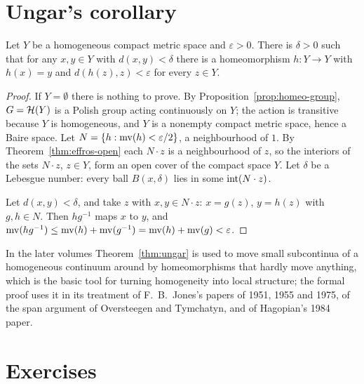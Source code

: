 \section{Ungar's corollary}

\begin{theorem}\label{thm:ungar}
Let $Y$ be a homogeneous compact metric space and $\varepsilon>0$. There is $\delta>0$ such that for any
$x,y\in Y$ with $d(x,y)<\delta$ there is a homeomorphism $h\colon Y\to Y$ with $h(x)=y$ and
$d(h(z),z)<\varepsilon$ for every $z\in Y$.
\end{theorem}

\begin{proof}
If $Y=\emptyset$ there is nothing to prove. By Proposition~\ref{prop:homeo-group}, $G=\mathcal{H}(Y)$ is a
Polish group acting continuously on $Y$; the action is transitive because $Y$ is homogeneous, and $Y$
is a nonempty compact metric space, hence a Baire space. Let $N=\left\{ h:\operatorname{mv}(h)<\varepsilon/2 \right\}$, a
neighbourhood of $1$. By Theorem~\ref{thm:effros-open} each $N\cdot z$ is a neighbourhood of $z$, so the
interiors of the sets $N\cdot z$, $z\in Y$, form an open cover of the compact space $Y$. Let $\delta$ be
a Lebesgue number: every ball $B(x,\delta)$ lies in some $\operatorname{int}(N\cdot z)$.

Let $d(x,y)<\delta$, and take $z$ with $x,y\in N\cdot z$: $x=g(z)$, $y=h(z)$ with $g,h\in N$. Then
$hg^{-1}$ maps $x$ to $y$, and $\operatorname{mv}(hg^{-1})\le\operatorname{mv}(h)+\operatorname{mv}(g^{-1})=\operatorname{mv}(h)+\operatorname{mv}(g)<\varepsilon$.
\end{proof}


\begin{remark}
In the later volumes Theorem~\ref{thm:ungar} is used to move small subcontinua of a homogeneous
continuum around by homeomorphisms that hardly move anything, which is the basic tool for turning
homogeneity into local structure; the formal proof uses it in its treatment of F.~B.~Jones's
papers of 1951, 1955 and 1975, of the span argument of Oversteegen and Tymchatyn, and of Hagopian's
1984 paper.
\end{remark}

\section*{Exercises}

